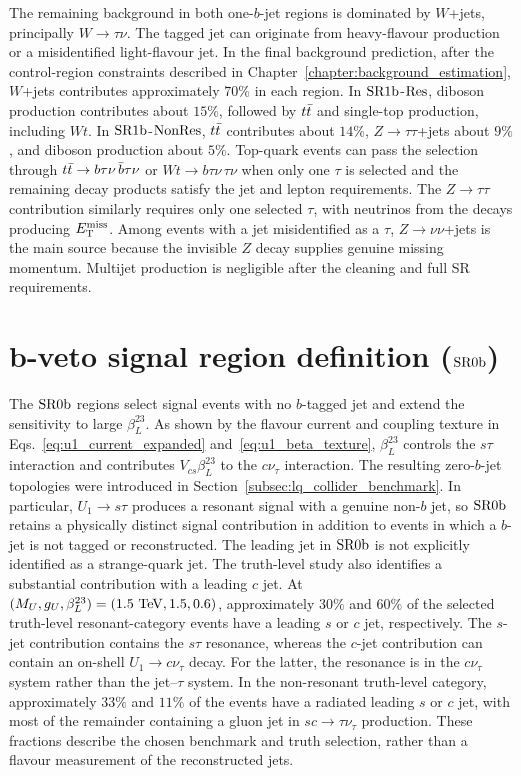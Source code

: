 The remaining background in both one-$b$-jet regions is dominated by $W$+jets, principally $W\to\tau\nu$.
The tagged jet can originate from heavy-flavour production or a misidentified light-flavour jet.
In the final background prediction, after the control-region constraints described in Chapter~\ref{chapter:background_estimation}, $W$+jets contributes approximately $70\%$ in each region.
In $\mathrm{SR1b}$-$\mathrm{Res}$, diboson production contributes about $15\%$, followed by $t\bar{t}$ and single-top production, including $Wt$.
In $\mathrm{SR1b}$-$\mathrm{NonRes}$, $t\bar{t}$ contributes about $14\%$, $Z\to\tau\tau$+jets about $9\%$, and diboson production about $5\%$.
Top-quark events can pass the selection through $t\bar{t}\to b\tau\nu\,\bar b\tau\nu$ or $Wt\to b\tau\nu\,\tau\nu$ when only one $\tau$ is selected and the remaining decay products satisfy the jet and lepton requirements.
The $Z\to\tau\tau$ contribution similarly requires only one selected $\tau$, with neutrinos from the decays producing $E_{\mathrm{T}}^{\mathrm{miss}}$.
Among events with a jet misidentified as a $\tau$, $Z\to\nu\nu$+jets is the main source because the invisible $Z$ decay supplies genuine missing momentum.
Multijet production is negligible after the cleaning and full SR requirements.

\clearpage
\section[b-veto signal region definition (SR0b)]{b-veto signal region definition ($\mathrm{SR0b}$)}
\label{sec:ch7_sr0b}

The $\mathrm{SR0b}$ regions select signal events with no $b$-tagged jet and extend the sensitivity to large $\beta_L^{23}$.
As shown by the flavour current and coupling texture in Eqs.~\ref{eq:u1_current_expanded} and~\ref{eq:u1_beta_texture}, $\beta_L^{23}$ controls the $s\tau$ interaction and contributes $V_{cs}\beta_L^{23}$ to the $c\nu_\tau$ interaction.
The resulting zero-$b$-jet topologies were introduced in Section~\ref{subsec:lq_collider_benchmark}.
In particular, $U_1\to s\tau$ produces a resonant signal with a genuine non-$b$ jet, so $\mathrm{SR0b}$ retains a physically distinct signal contribution in addition to events in which a $b$-jet is not tagged or reconstructed.
The leading jet in $\mathrm{SR0b}$ is not explicitly identified as a strange-quark jet.
The truth-level study also identifies a substantial contribution with a leading $c$ jet.
At $(M_U,g_U,\beta_L^{23})=(1.5~\mathrm{TeV},1.5,0.6)$, approximately $30\%$ and $60\%$ of the selected truth-level resonant-category events have a leading $s$ or $c$ jet, respectively.
The $s$-jet contribution contains the $s\tau$ resonance, whereas the $c$-jet contribution can contain an on-shell $U_1\to c\nu_\tau$ decay.
For the latter, the resonance is in the $c\nu_\tau$ system rather than the jet--$\tau$ system.
In the non-resonant truth-level category, approximately $33\%$ and $11\%$ of the events have a radiated leading $s$ or $c$ jet, with most of the remainder containing a gluon jet in $sc\to\tau\nu_\tau$ production.
These fractions describe the chosen benchmark and truth selection, rather than a flavour measurement of the reconstructed jets.

